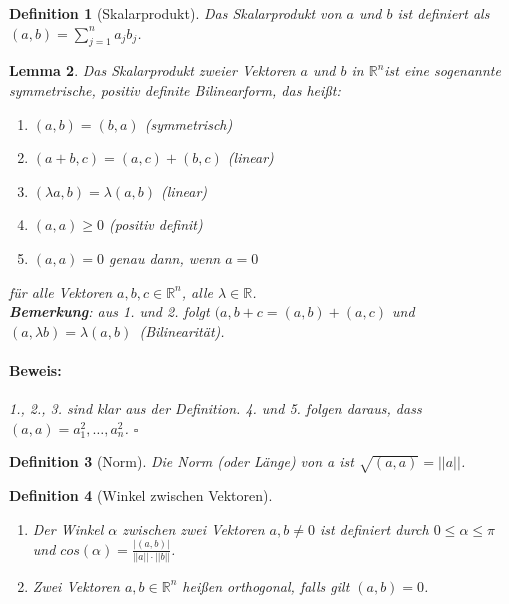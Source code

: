 \documentclass{report}
\newcommand{\IN}[1]{\index{#1|BH}}
\newcommand{\lb}{\lambda}
\newcommand{\R}{\mathbb{R}}
\newcommand{\Rn}{\mathbb{R}^n}
\newcommand{\mRn}{$\mathbb{R}^n$}
\newcommand{\al}{\alpha}
\theoremstyle{customrem}
\theoremstyle{customdef}
\newtheorem{definition}{Definition}[chapter]
\newtheorem{lemma}[definition]{Lemma}
\renewenvironment{proof}{\vspace{-.75cm}\paragraph{Beweis: }}{\vspace{-.5cm}\hfill$\square$}
\begin{document}
	\begin{definition}[Skalarprodukt]
		\IN{Skalar!-produkt}
		Das Skalarprodukt von $a$ und $b$ ist definiert als $(a, b) = \sum_{j=1}^n a_j b_j$.
	\end{definition}
	
	\begin{lemma}
		Das Skalarprodukt zweier Vektoren $a$ und $b$ in \mRn ist eine sogenannte symmetrische, positiv definite Bilinearform, das heißt:
		\begin{enumerate}
			\item $(a, b) = (b, a)$ (symmetrisch) 
			\item $(a + b, c) = (a, c) + (b, c)$ (linear) 
			\item $(\lb a, b) = \lb(a, b)$ (linear) 
			\item $(a, a) \ge 0$ (positiv definit) 
			\item $(a, a) = 0$ genau dann, wenn $a=0$ 
		\end{enumerate}
		für alle Vektoren $a, b, c \in \Rn$, alle $\lb \in \R$.\\
		\textbf{Bemerkung}: aus 1. und 2. folgt $(a, b+c = (a,b) + (a,c)$ und $(a, \lb b) = \lb (a, b)$\ (Bilinearität).\\
		\begin{proof}
			1., 2., 3. sind klar aus der Definition. 4. und 5. folgen daraus, dass $(a, a) = a_1^2, \ldots, a_n^2$.
		\end{proof}
	\end{lemma}
	\vspace{.2cm}
	\begin{definition}[Norm]
		Die Norm (oder Länge) von a ist $\sqrt{(a, a)} = ||a||$.
	\end{definition}

	\begin{definition}[Winkel zwischen Vektoren]$ $\vspace{-.5cm}
		\begin{enumerate}
			\item Der Winkel $\al$ zwischen zwei Vektoren $a, b \neq 0$ ist definiert durch $0 \le \al \le \pi$ und $cos(\al) = \frac{|(a,b)|}{||a||\cdot ||b||}$.
			\item Zwei Vektoren $a, b \in \R^n$ heißen orthogonal, falls gilt $(a, b) = 0$.
		\end{enumerate}
	\end{definition}
	
\end{document}
